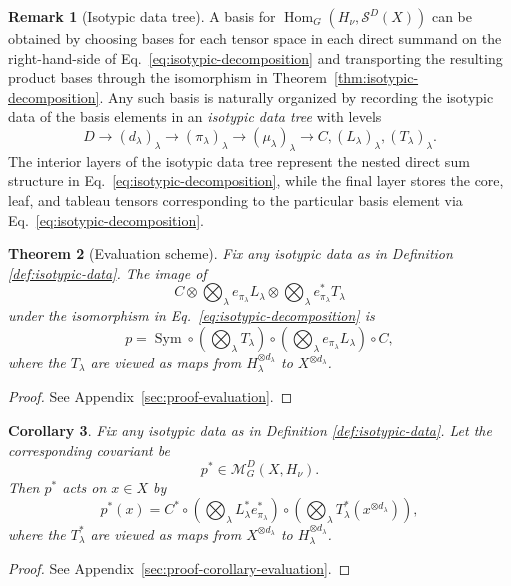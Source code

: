 \documentclass[11pt]{article}
\newcommand{\scM}{\mathcal{M}}
\newcommand{\scS}{\mathcal{S}}
\newcommand{\HomG}[2]{\operatorname{Hom}_G\!\left(#1,#2\right)}
\newcommand{\Sym}{\operatorname{Sym}}
\newtheorem{theorem}{Theorem}[section]
\newtheorem{corollary}[theorem]{Corollary}
\theoremstyle{definition}
\newtheorem{remark}[theorem]{Remark}
\begin{document}
\begin{remark}[Isotypic data tree]\label{rem:isotypic-data-tree}
  A basis for $\HomG{H_\nu}{\scS^D(X)}$ can be obtained by choosing bases for each tensor space in each direct summand on the right-hand-side of Eq.~\eqref{eq:isotypic-decomposition} and transporting the resulting product bases through the isomorphism in Theorem~\ref{thm:isotypic-decomposition}.
  Any such basis is naturally organized by recording the isotypic data of the basis elements in an \emph{isotypic data tree} with levels
  \[
    D \longrightarrow (d_\lambda)_\lambda \longrightarrow (\pi_\lambda)_\lambda \longrightarrow (\mu_\lambda)_\lambda \longrightarrow C, (L_\lambda)_\lambda, (T_\lambda)_\lambda.
  \]
  The interior layers of the isotypic data tree represent the nested direct sum structure in Eq.~\eqref{eq:isotypic-decomposition}, while the final layer stores the core, leaf, and tableau tensors corresponding to the particular basis element via Eq.~\eqref{eq:isotypic-decomposition}.
\end{remark}

\begin{theorem}[Evaluation scheme]\label{thm:evaluation}
  Fix any isotypic data as in Definition \ref{def:isotypic-data}.
  The image of
  \begin{equation}\label{eq:isotypic-data-tensor}
    C
    \otimes
    \bigotimes_\lambda
    e_{\pi_\lambda} L_\lambda
    \otimes
    \bigotimes_\lambda
    e_{\pi_\lambda}^* T_\lambda
  \end{equation}
  under the isomorphism in Eq.~\eqref{eq:isotypic-decomposition} is
  \begin{equation}\label{eq:evaluation}
    p
    =
    \Sym
    \circ
    \left(\bigotimes_\lambda T_\lambda\right)
    \circ
    \left(\bigotimes_\lambda e_{\pi_\lambda} L_\lambda\right)
    \circ
    C,
  \end{equation}
  where the $T_\lambda$ are viewed as maps from $H_\lambda^{\otimes d_\lambda}$ to $X^{\otimes d_\lambda}$.
\end{theorem}
\begin{proof}
  See Appendix~\ref{sec:proof-evaluation}.
\end{proof}

\begin{corollary}\label{cor:evaluation}
  Fix any isotypic data as in Definition \ref{def:isotypic-data}.
  Let the corresponding covariant be
  \[
    p^* \in \scM_G^D(X,H_\nu).
  \]
  Then $p^*$ acts on $x \in X$ by
  \begin{equation}
    p^*(x)
    =
    C^*
    \circ
    \left(\bigotimes_\lambda L_\lambda^*e^*_{\pi_\lambda}\right)
    \circ
    \left(\bigotimes_\lambda T_\lambda^*(x^{\otimes d_\lambda})\right),
  \end{equation}
  where the $T_\lambda^*$ are viewed as maps from $X^{\otimes d_\lambda}$ to $H_\lambda^{\otimes d_\lambda}$.
\end{corollary}
\begin{proof}
  See Appendix~\ref{sec:proof-corollary-evaluation}.
\end{proof}
\end{document}

